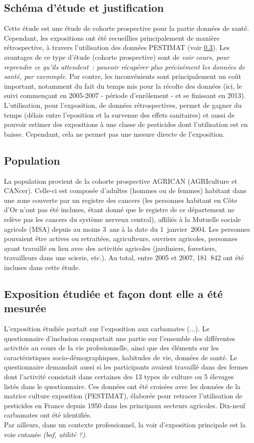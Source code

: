 \documentclass[10pt]{article}
\begin{document}
\subsection{Schéma d'étude et justification}
Cette étude est une étude de cohorte prospective pour la partie données de santé. Cependant, les expositions ont été recueillies principalement de manière rétrospective, à travers l'utilisation des données PESTIMAT (voir \ref{exposition}). Les avantages de ce type d'étude (cohorte prospective) sont de \emph{voir cours, pour reprendre ce qu'ils attendent~: pouvoir récupérer plus précisément les données de santé, par exemmple}. Par contre, les inconvénients sont principalement un coût important, notamment du fait du temps mis pour la récolte des données (ici, le suivi commençant en 2005-2007 - période d'enrôlement - et se finissant en 2013). L'utilisation, pour l'exposition, de données rétrospectives, permet de gagner du temps (délais entre l'eposition et la survenue des effets sanitaires) et aussi de pouvoir estimer des expositions à une classe de pesticides dont l'utilisation est en baisse. Cependant, cela ne permet pas une mesure directe de l'exposition. 

\subsection{Population}
La population provient de la cohorte prospective AGRICAN (AGRIculture et CANcer). Celle-ci est composée d'adultes (hommes ou de femmes) habitant dans une zone couverte par un registre des cancers (les personnes habitant en Côte d'Or n'ont pas été incluses, étant donné que le registre de ce département ne relève pas les cancers du système nerveux central), affiliés à la Mutuelle sociale agricole (MSA) depuis au moins 3~ans à la date du 1~janvier~2004. Les personnes pouvaient être actives ou retraitées, agriculteurs, ouvriers agricoles, personnes ayant travaillé en lien avec des activités agricoles (jardiniers, forestiers, travailleurs dans une scierie, etc.). Au total, entre 2005 et 2007, 181~842 ont été incluses dans cette étude.

\subsection{Exposition étudiée et façon dont elle a été mesurée}
\label{exposition}
L'exposition étudiée portait sur l'exposition aux carbamates (...). Le questionnaire d'inclusion comportait une partie sur l'ensemble des différentes activités au cours de la vie profesionnelle, ainsi que des éléments sur les caractéristiques socio-démographiques, habitudes de vie, données de santé. Le questionnaire demandait aussi si les participants avaient travaillé dans des fermes dont l'activité consistait dans certaines des 13 types de culture ou 5 élevages listés dans le questionnaire. Ces données ont été croisées avec les données de la matrice culture exposition (PESTIMAT), élaborée pour retracer l'utilisation de pesticides en France depuis 1950 dans les principaux secteurs agricoles. Dix-neuf carbamates ont été identifiés.\\
Par ailleurs, dans un contexte professionnel, la voir d'exposition principale est la voie cutanée \emph{(bof, utilité ?)}.
\end{document}
